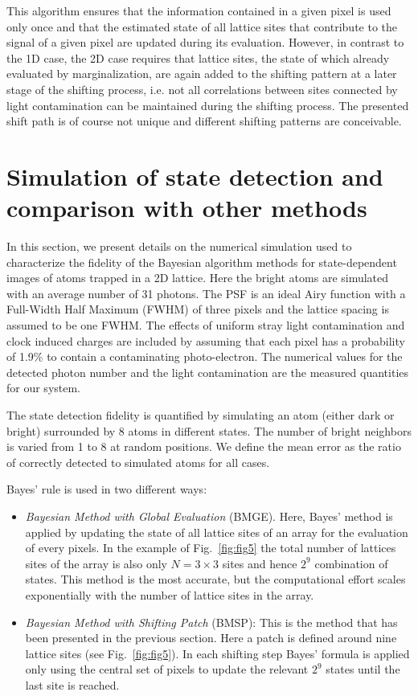 \documentclass[aps,prl,twocolumn,english,showpacs]{revtex4-1}
\begin{document}
This algorithm ensures that the information contained in a given pixel is used only once and that the estimated state of all lattice sites that contribute to the signal of a given pixel are updated during its evaluation. However, in contrast to the 1D case, the 2D case requires that lattice sites, the state of which already evaluated by marginalization, are again added to the shifting pattern at a later stage of the shifting process, i.e. not all correlations between sites connected by light contamination can be maintained during the shifting process. The presented shift path is of course not unique and different shifting patterns are conceivable.


\section{Simulation of state detection and comparison with other methods}

In this section, we present details on the numerical simulation used to characterize the fidelity of the Bayesian algorithm methods for state-dependent images of atoms trapped in a 2D lattice. Here the bright atoms are simulated with an average number of 31 photons. The PSF is an ideal Airy function with a Full-Width Half Maximum (FWHM) of three pixels and the lattice spacing is assumed to be one FWHM. The effects of uniform stray light contamination and clock induced charges are included by assuming that each pixel has a probability of 1.9\% to contain a contaminating  photo-electron. The numerical values for the detected photon number and the light contamination are the measured quantities for our system.

The state detection fidelity is quantified by simulating an atom (either dark or bright) surrounded by 8 atoms in different states. The number of bright neighbors is varied from 1 to 8 at random positions.  We define the mean error as the ratio of correctly detected to simulated atoms for all cases.

Bayes' rule is used in two different ways:
\begin{itemize}

\item \textit{Bayesian Method with Global Evaluation} (BMGE). Here, Bayes' method is applied by updating the state of all lattice sites of an array for the evaluation of every pixels.  In the example of Fig.~\ref{fig:fig5} the total number of lattices sites of the array is also only $N=3\times3$ sites and hence $2^9$ combination of states. This method is the most accurate, but the computational effort scales exponentially with the number of lattice sites in the array.

\item  \textit{Bayesian Method with Shifting Patch} (BMSP): This is the method that has been presented in the previous section. Here a patch is defined around nine lattice sites (see Fig.~\ref{fig:fig5}). In each shifting step Bayes' formula is applied only using the central set of pixels to update the relevant $2^9$ states until the last site is reached. 

\end{itemize}
\end{document}
